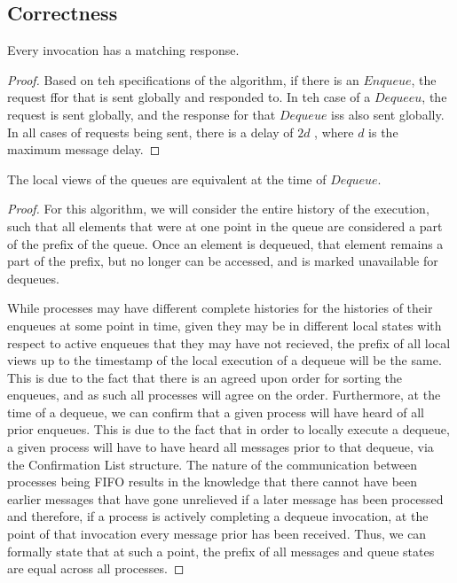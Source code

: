 \documentclass[a4paper,USenglish]{lipics-v2021} %
\begin{document}
\subsection{Correctness}

\begin{lemma}
  Every invocation has a matching response.
\end{lemma}

\begin{proof}
Based on teh specifications of the algorithm, if there is an $Enqueue$, the request ffor that is sent globally and responded to.  In teh case of a $Dequeeu$, the request is sent globally, and the response for that $Dequeue$ iss also sent globally.  In all cases of requests being sent, there is a delay of $2d$ , where $d$ is the maximum message delay.
\end{proof}

\begin{lemma}
  The local views of the queues are equivalent at the time of $Dequeue$.
\end{lemma}

\begin{proof}
  For this algorithm, we will consider the entire history of the execution, such that all elements that were at one point in the queue are considered a part of the prefix of the queue. Once an element is dequeued, that element remains a part of the prefix, but no longer can be accessed, and is marked unavailable for dequeues.
  
While processes may have different complete histories for the histories of their enqueues at some point in time, given they may be in different local states with respect to active enqueues that they may have not recieved, the prefix of all local views up to the timestamp of the local execution of a dequeue will be the same. This is due to the fact that there is an agreed upon order for sorting the enqueues, and as such all processes will agree on the order. Furthermore, at the time of a dequeue, we can confirm that a given process will have heard of all prior enqueues. This is due to the fact that in order to locally execute a dequeue, a given process will have to have heard all messages prior to that dequeue, via the Confirmation List structure. The nature of the communication between processes being FIFO results in the knowledge that there cannot have been earlier messages that have gone unrelieved if a later message has been processed and therefore, if a process is actively completing a dequeue invocation, at the point of that invocation every message prior has been received. Thus, we can formally state that at such a point, the prefix of all messages and queue states are equal across all processes.
\end{proof}
\end{document}
